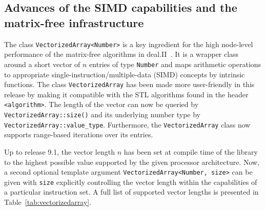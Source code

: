 \documentclass{ansarticle-preprint}
\begin{document}


\subsection{Advances of the SIMD capabilities and the matrix-free infrastructure}
\label{subsec:mf}


The class \texttt{VectorizedArray<Number>} is a key ingredient for the high
node-level performance of the matrix-free algorithms in deal.II~\cite{KronbichlerKormann2012, KronbichlerKormann2019}. It is a wrapper
class around a short vector of $n$ entries of type \texttt{Number} and maps
arithmetic operations to appropriate single-instruction/multiple-data (SIMD)
concepts by intrinsic functions.
The class \texttt{VectorizedArray} has been made more user-friendly in this release by making
it compatible with the STL algorithms found in the header \texttt{<algorithm>}.
The length of the  vector can now be queried by  \texttt{VectorizedArray::size()} and its underlying number type by \texttt{VectorizedArray::value\_type}.
Furthermore, the \texttt{VectorizedArray} class now supports range-based iterations over its entries.

Up to release 9.1, the
vector length $n$ has been set at compile time of the library to the highest
possible value supported by the given processor architecture.
Now, a second optional template argument
\texttt{VectorizedArray<Number, size>} can be given with \texttt{size} explicitly controlling
the vector length within the capabilities of a particular instruction set.
A full list of supported
vector lengths is presented in Table~\ref{tab:vectorizedarray}.
\end{document}
